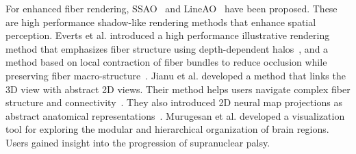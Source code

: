 For enhanced fiber rendering, SSAO~\cite{mittring2007finding} and LineAO~\cite{eichelbaum2013lineao} have been proposed. These are high performance shadow-like rendering methods that enhance spatial perception. %
Everts et al. introduced a high performance illustrative rendering method that emphasizes fiber structure using depth-dependent halos~\cite{everts2009depth}, and a method based on local contraction of fiber bundles to reduce occlusion while preserving fiber macro-structure~\cite{everts2015exploration}. Jianu et al. developed a method that links the 3D view with abstract 2D views. Their method helps users navigate complex fiber structure and connectivity~\cite{jianu2009exploring}. They also introduced 2D neural map projections as abstract anatomical representations~\cite{jianu2012exploring}.
Murugesan et al.\cite{murugesan2017brain} developed a visualization tool for exploring the modular and hierarchical organization of brain regions. Users gained insight into the progression of supranuclear palsy.

